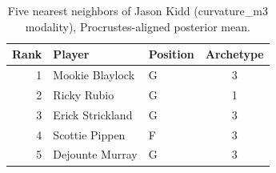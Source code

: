 \begin{table}[htbp]
  \centering\small
  \begin{tabular}{rllc}
    \toprule
    Rank & Player & Position & Archetype \\
    \midrule
    1 & Mookie Blaylock & G & 3 \\
    2 & Ricky Rubio & G & 1 \\
    3 & Erick Strickland & G & 3 \\
    4 & Scottie Pippen & F & 3 \\
    5 & Dejounte Murray & G & 3 \\
    \bottomrule
  \end{tabular}
  \caption{Five nearest neighbors of Jason Kidd (curvature_m3 modality), Procrustes-aligned posterior mean.}
  \label{tab:Jason_Kidd_neighbors_curvature_m3}
\end{table}

